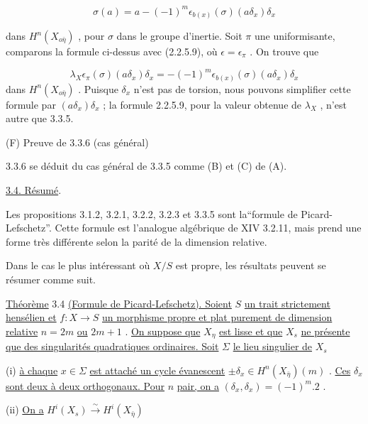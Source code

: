 \begin{equation*}
\sigma(a) = a - (-1)^m \epsilon_{b(x)}(\sigma)(a\delta_x)\delta_x 
\end{equation*}


 dans $H^n(X_{o\bar{\eta}})$ , pour $\sigma$ dans le groupe d'inertie. Soit $\pi$ une uniformisante, comparons la formule ci-dessus avec (2.2.5.9), où $\epsilon = \epsilon_{\pi}$ . On trouve que

\begin{equation*}
\lambda_X \epsilon_{\pi}(\sigma)(a\delta_x)\delta_x = - (-1)^m \epsilon_{b(x)}(\sigma)(a\delta_x)\delta_x
\end{equation*}
dans $H^n(X_{o\bar{\eta}})$ . Puisque $\delta_x$ n'est pas de torsion, nous pouvons simplifier cette formule par $(a\delta_x)\delta_x$ ; la formule 2.2.5.9, pour la valeur obtenue de $\lambda_X$ , n'est autre que 3.3.5.

(F) Preuve de 3.3.6 (cas général)

3.3.6 se déduit du cas général de 3.3.5 comme (B) et (C) de (A).


\underline{3.4. \quad Résumé}.

Les propositions 3.1.2, 3.2.1, 3.2.2, 3.2.3 et 3.3.5 sont la``formule de Picard-Lefschetz''. Cette formule est l'analogue algébrique de XIV 3.2.11, mais prend une forme très différente selon la parité de la dimension relative.

Dans le cas le plus intéressant où $X/S$ est propre, les résultats peuvent se résumer comme suit.

\underline{Théorème} 3.4 \underline{(Formule de Picard-Lefschetz). Soient} $S$ \underline{un trait strictement hensélien et} $f : X \to S$ \underline{un morphisme propre et plat purement de dimension relative} $n = 2m$ \underline{ou} $2m + 1$ . \underline{On suppose que} $X_{\eta}$ \underline{est lisse et que} $X_s$ \underline{ne présente que des singularités quadratiques ordinaires. Soit} $\Sigma$ \underline{le lieu singulier de} $X_s$

(i) \underline{à chaque} $x \in \Sigma$ \underline{est attaché un cycle évanescent} $\pm \delta_x \in H^n(X_{\bar{\eta}})(m)$ . \underline{Ces} $\delta_x$ \underline{sont deux à deux orthogonaux. Pour} $n$ \underline{pair, on a} $(\delta_x,\delta_x) = (-1)^m.2$ .

(ii) \underline{On a} \qquad $H^i(X_s) \xrightarrow{\ \sim\ } H^i(X_{\bar{\eta}})$

